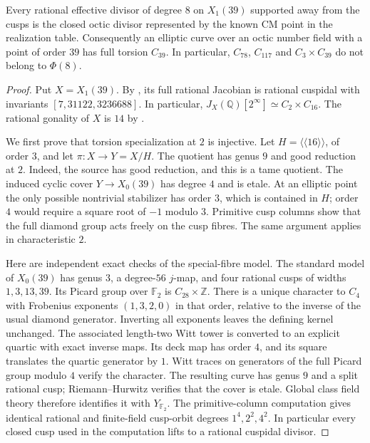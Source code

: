 \begin{proposition}\label{prop:all-octic-39}
Every rational effective divisor of degree $8$ on $X_1(39)$ supported
away from the cusps is the closed octic divisor represented by the
known CM point in the realization table. Consequently an elliptic
curve over an octic number field with a point of order $39$ has full
torsion $C_{39}$. In particular, $C_{78}$, $C_{117}$ and
$C_3\times C_{39}$ do not belong to $\Phi(8)$.
\end{proposition}
\begin{proof}
Put $X=X_1(39)$. By \cite[Theorem~3.1(2), Theorem~4.13 and
Table~2]{DEHMZ}, its full rational Jacobian is rational cuspidal with
invariants $[7,31122,3236688]$. In particular,
$J_X(\mathbb Q)[2^\infty]\simeq C_2\times C_{16}$.
The rational gonality of $X$ is $14$ by \cite[Table~1]{DvH}.

We first prove that torsion specialization at $2$ is injective. Let
$H=\langle\langle16\rangle\rangle$, of order $3$, and let
$\pi:X\to Y=X/H$. The quotient has genus $9$ and good reduction at
$2$. Indeed, the source has good reduction, and this is a tame
quotient. The induced cyclic cover $Y\to X_0(39)$ has degree $4$
and is etale. At an elliptic point the only possible nontrivial
stabilizer has order $3$, which is contained in $H$; order $4$ would
require a square root of $-1$ modulo $3$. Primitive cusp columns
show that the full diamond group acts freely on the cusp fibres.
The same argument applies in characteristic $2$.

Here are independent exact checks of the special-fibre model.
The standard model of $X_0(39)$ has genus $3$, a degree-$56$
$j$-map, and four rational cusps of widths $1,3,13,39$.
Its Picard group over $\mathbb F_2$ is $C_{28}\times\mathbb Z$.
There is a unique character to $C_4$ with Frobenius exponents
$(1,3,2,0)$ in that order, relative to the inverse of the usual
diamond generator. Inverting all exponents leaves the defining
kernel unchanged. The associated length-two Witt tower is converted
to an explicit quartic with exact inverse maps. Its deck map has
order $4$, and its square translates the quartic generator by $1$.
Witt traces on generators of the full Picard group modulo $4$
verify the character. The resulting curve has genus $9$ and a split
rational cusp; Riemann--Hurwitz verifies that the cover is etale.
Global class field theory therefore identifies it with
$Y_{\mathbb F_2}$. The primitive-column computation gives identical
rational and finite-field cusp-orbit degrees $1^4,2^2,4^2$.
In particular every closed cusp used in the computation lifts to a
rational cuspidal divisor.


\end{proof}
